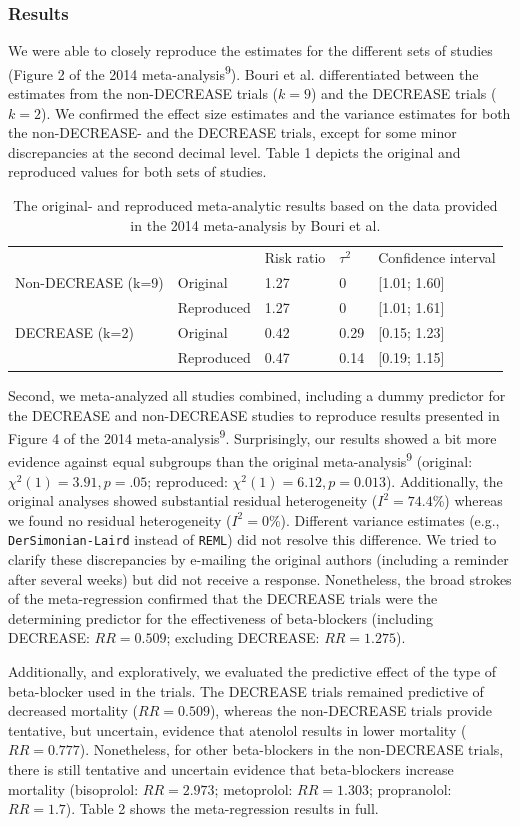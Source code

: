 \documentclass[]{article}
\begin{document}
\subsubsection{Results}\label{results}

We were able to closely reproduce the estimates for the different sets
of studies (Figure 2 of the 2014 meta-analysis\textsuperscript{9}).
Bouri et al. differentiated between the estimates from the non-DECREASE
trials (\(k=9\)) and the DECREASE trials (\(k=2\)). We confirmed the
effect size estimates and the variance estimates for both the
non-DECREASE- and the DECREASE trials, except for some minor
discrepancies at the second decimal level. Table 1 depicts the original
and reproduced values for both sets of studies.

\begin{longtable}[]{@{}lllll@{}}
\caption{The original- and reproduced meta-analytic results based on the
data provided in the 2014 meta-analysis by Bouri et al.}\tabularnewline
\toprule
& & Risk ratio & \(\tau^2\) & Confidence interval\tabularnewline
Non-DECREASE (k=9) & Original & 1.27 & 0 & {[}1.01;
1.60{]}\tabularnewline
& Reproduced & 1.27 & 0 & {[}1.01; 1.61{]}\tabularnewline
DECREASE (k=2) & Original & 0.42 & 0.29 & {[}0.15;
1.23{]}\tabularnewline
& Reproduced & 0.47 & 0.14 & {[}0.19; 1.15{]}\tabularnewline
\bottomrule
\end{longtable}

Second, we meta-analyzed all studies combined, including a dummy
predictor for the DECREASE and non-DECREASE studies to reproduce results
presented in Figure 4 of the 2014 meta-analysis\textsuperscript{9}.
Surprisingly, our results showed a bit more evidence against equal
subgroups than the original meta-analysis\textsuperscript{9} (original:
\(\chi^2(1)=3.91,p=.05\); reproduced: \(\chi^2(1)=6.12,p=0.013\)).
Additionally, the original analyses showed substantial residual
heterogeneity (\(I^2=74.4\)\%) whereas we found no residual
heterogeneity (\(I^2=0\)\%). Different variance estimates (e.g.,
\texttt{DerSimonian-Laird} instead of \texttt{REML}) did not resolve
this difference. We tried to clarify these discrepancies by e-mailing
the original authors (including a reminder after several weeks) but did
not receive a response. Nonetheless, the broad strokes of the
meta-regression confirmed that the DECREASE trials were the determining
predictor for the effectiveness of beta-blockers (including DECREASE:
\(RR=0.509\); excluding DECREASE: \(RR=1.275\)).

Additionally, and exploratively, we evaluated the predictive effect of
the type of beta-blocker used in the trials. The DECREASE trials
remained predictive of decreased mortality (\(RR=0.509\)), whereas the
non-DECREASE trials provide tentative, but uncertain, evidence that
atenolol results in lower mortality (\(RR=0.777\)). Nonetheless, for
other beta-blockers in the non-DECREASE trials, there is still tentative
and uncertain evidence that beta-blockers increase mortality
(bisoprolol: \(RR=2.973\); metoprolol: \(RR=1.303\); propranolol:
\(RR=1.7\)). Table 2 shows the meta-regression results in full.
\end{document}
